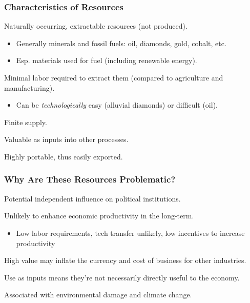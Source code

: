 \documentclass{beamer}
\begin{document}
\begin{frame} 
	\frametitle{\LARGE{Characteristics of Resources}}
	\begin{itemize}
		\large{  
			\item Naturally occurring, extractable resources (not produced). \pause 
			\begin{itemize}
				\item Generally minerals and fossil fuels: oil, diamonds, gold, cobalt, etc. \pause 
				\item Esp. materials used for fuel (including renewable energy). \pause 
			\end{itemize}
			\item Minimal labor required to extract them (compared to agriculture and manufacturing). \pause 
			\begin{itemize}
				\item Can be \textit{technologically} easy (alluvial diamonds) or difficult (oil). \pause 
			\end{itemize}
			
			\item Finite supply. \pause 
			
			\item Valuable as inputs into other processes. \pause 
			
			\item Highly portable, thus easily exported.
		}
	\end{itemize}
\end{frame}

\begin{frame} 
	\frametitle{\LARGE{Why Are These Resources Problematic?}}
	\begin{itemize}
		\large{
			\item Potential independent influence on political institutions. \pause
			
			\item Unlikely to enhance economic productivity in the long-term. \pause
			\begin{itemize}
				\item Low labor requirements, tech transfer unlikely, low incentives to increase productivity \pause
			\end{itemize}
			
			\item High value may inflate the currency and cost of business for other industries.  \pause
			
			\item Use as inputs means they're not necessarily directly useful to the economy. \pause
			
			\item Associated with environmental damage and climate change.
		}
	\end{itemize}
\end{frame}
\end{document}
